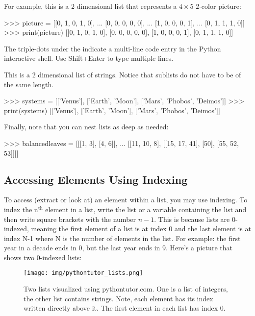 \documentclass[11pt]{cselabheader}
\begin{document}
For example, this is a 2 dimensional list that represents a $4\times 5$
2-color picture:

\begin{pyconcode}
>>> picture = [[0, 1, 0, 1, 0],
...            [0, 0, 0, 0, 0],
...            [1, 0, 0, 0, 1],
...            [0, 1, 1, 1, 0]]
>>> print(picture)
[[0, 1, 0, 1, 0], [0, 0, 0, 0, 0], [1, 0, 0, 0, 1], [0, 1, 1, 1, 0]]

\end{pyconcode}

The triple-dots  under the \bashinline{>>>} indicate a
multi-line code entry in the Python interactive shell. Use
Shift+Enter to type multiple lines.

This is a 2 dimensional list of strings. Notice that sublists do not have
to be of the same length.

\begin{pyconcode}
>>> systems = [['Venus'], ['Earth', 'Moon'], ['Mars', 'Phobos', 'Deimos']]
>>> print(systems)
[['Venus'], ['Earth', 'Moon'], ['Mars', 'Phobos', 'Deimos']]

\end{pyconcode}

Finally, note that you can nest lists as deep as needed:
\begin{pyconcode}
>>> balancedleaves = [[[1, 3], [4, 6]],
...                   [[11, 10, 8], [[15, 17, 41], [50], [55, 52, 53]]]]

\end{pyconcode}


\subsection{Accessing Elements Using Indexing}

To access (extract or look at) an element within a list, you may
use indexing. To index %
the n$^\text{th}$ element in a list, write the list or a variable
containing the list and then write square brackets with the number
$n - 1$. This is because lists are 0-indexed, meaning
the first element of a list is at index 0 and the last element is at
index N-1 where N is the number of elements in the list.
For example: the first year in a decade ends in 0, but the last year ends in 9.
Here's a picture that shows two 0-indexed lists:

\begin{figure}[H]
  \begin{center}
  \texttt{[image: img/pythontutor\_lists.png]}
  \end{center}
  \caption{Two lists visualized using pythontutor.com. One is a list of integers, the other list contains strings. Note, each element has its index written directly above it. The first element in each list has index 0.}
\end{figure}
\end{document}
